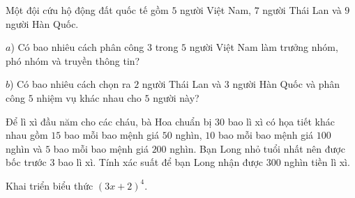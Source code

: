 \begin{ex}%
	Một đội cứu hộ động đất quốc tế gồm $5$ người Việt Nam, $7$ người Thái Lan và $9$ người Hàn Quốc.
	
	$a$) Có bao nhiêu cách phân công $3$ trong $5$ người Việt Nam làm trưởng nhóm, phó nhóm và truyền thông tin?
	
	$b$) Có bao nhiêu cách chọn ra $2$ người Thái Lan và $3$ người Hàn Quốc và phân công $5$ nhiệm vụ khác nhau cho $5$ người này?
\end{ex}

\begin{ex}%
	Để lì xì đầu năm cho các cháu, bà Hoa chuẩn bị $30$ bao lì xì có họa tiết khác nhau gồm $15$ bao mỗi bao mệnh giá $50$ nghìn, $10$ bao mỗi bao mệnh giá $100$ nghìn và $5$ bao mỗi bao mệnh giá $200$ nghìn. Bạn Long nhỏ tuổi nhất nên được bốc trước $3$ bao lì xì. Tính xác suất để bạn Long nhận được $300$ nghìn tiền lì xì.
\end{ex}

\begin{ex}%
	Khai triển biểu thức $(3x+2)^4$.
\end{ex}


